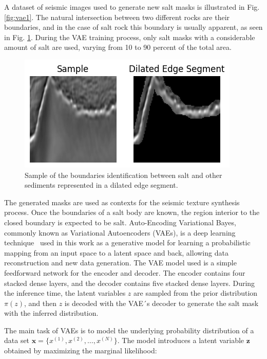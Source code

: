 \documentclass{ieeeaccess}
\begin{document}
A dataset of seismic images used to generate new salt masks is illustrated in Fig. \ref{fig:vae1}. The natural intersection between two different rocks are their boundaries, and in the case of salt rock this boundary is usually apparent, as seen in Fig. \ref{fig:edge1}. During the VAE training process, only salt masks with a considerable amount of salt are used, varying from 10 to 90 percent of the total area.
\begin{figure}
    \centering
    \includegraphics[width=1\linewidth]{images/edge detection.png}
    \caption{Sample of the boundaries identification between salt and other sediments represented in a dilated edge segment.}
    \label{fig:edge1}
\end{figure}

The generated masks are used as contexts for the seismic texture synthesis process. Once the boundaries of a salt body are known, the region interior to the closed boundary is expected to be salt. Auto-Encoding Variational Bayes, commonly known as Variational Autoencoders (VAEs), is a deep learning technique~\cite{ref8} used in this work as a generative model for learning a probabilistic mapping from an input space to a latent space and back, allowing data reconstruction and new data generation. The VAE model used is a simple feedforward network for the encoder and decoder. The encoder contains four stacked dense layers, and the decoder contains five stacked dense layers. During the inference time, the latent variables $z$ are sampled from the prior distribution $\pi(z)$, and then $z$ is decoded with the VAE´s decoder to generate the salt mask with the inferred distribution.

The main task of VAEs is to model the underlying probability distribution of a data set $\mathbf{x} = \{x^{(1)}, x^{(2)}, \ldots, x^{(N)}\}$. The model introduces a latent variable $\mathbf{z}$ obtained by maximizing the marginal likelihood:
\end{document}
